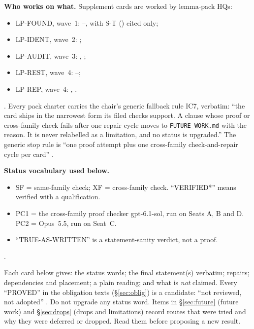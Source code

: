 \textbf{Who works on what.} Supplement cards are worked by lemma-pack HQs:
\begin{itemize}
\item LP-FOUND, wave~1: --, with S-T () cited only;
\item LP-IDENT, wave~2: ;
\item LP-AUDIT, wave~3: , ;
\item LP-REST, wave~4: --;
\item LP-REP, wave~4: , .
\end{itemize}
. Every pack charter carries the chair's generic fallback rule IC7, verbatim: ``the card ships in the narrowest form its filed checks support. A clause whose proof or cross-family check fails after one repair cycle moves to \texttt{FUTURE\_WORK.md} with the reason. It is never relabelled as a limitation, and no status is upgraded.'' The generic stop rule is ``one proof attempt plus one cross-family check-and-repair cycle per card'' .

\textbf{Status vocabulary used below.}
\begin{itemize}
\item SF = same-family check; XF = cross-family check. ``VERIFIED*'' means verified with a qualification.
\item PC1 = the cross-family proof checker gpt-6.1-sol, run on Seats A, B and D. PC2 = Opus~5.5, run on Seat~C.
\item ``TRUE-AS-WRITTEN'' is a statement-sanity verdict, not a proof.
\end{itemize}
 .

\begin{agentnote}
Each card below gives: the status words; the final statement(s) verbatim; repairs; dependencies and placement; a plain reading; and what is \emph{not} claimed.
Every ``PROVED'' in the obligation texts (§\ref{sec:oblig}) is a candidate: ``not reviewed, not adopted'' . Do not upgrade any status word.
Items in §\ref{sec:future} (future work) and §\ref{sec:drops} (drops and limitations) record routes that were tried and why they were deferred or dropped. Read them before proposing a new result.
\end{agentnote}

